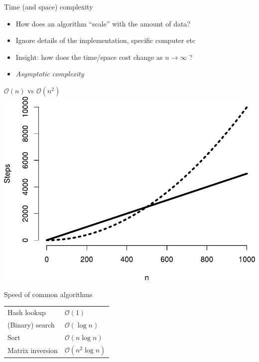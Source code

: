 \documentclass[aspectratio=169,12pt,usepdftitle=false]{beamer} %
\begin{document}
\begin{frame}{Time (and space) complexity}
    \begin{itemize}
	\item How does an algorithm ``scale'' with the amount of data?
	\item Ignore details of the implementation, specific computer etc
	\item Insight: how does the time/space cost change as $n\rightarrow\infty$ ?
	\item \emph{Asymptotic complexity} %
    \end{itemize}
\end{frame}

\begin{frame}{$\mathcal{O}(n)$ vs $\mathcal{O}(n^2)$}
\centering
\includegraphics[height=0.8\textheight]
	{ref/big-o-graph.pdf}
\end{frame}

\begin{frame}{Speed of common algorithms}
\centering
    \begin{tabular}{ll}
	Hash lookup & $\mathcal{O}(1)$ \\
	(Binary) search & $\mathcal{O}(\log{}n)$ \\
	Sort & $\mathcal{O}(n\log{}n)$ \\
	Matrix inversion & $\mathcal{O}(n^2\log{}n)$ \\
    \end{tabular}
\end{frame}
\end{document}
